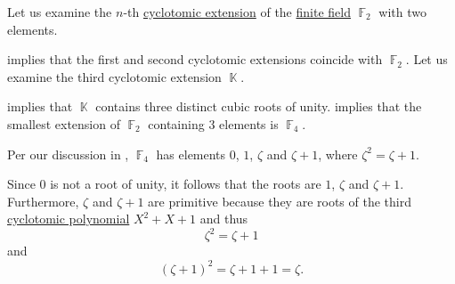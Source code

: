 \begin{example}
\begin{thmenum}
     Let us examine the \( n \)-th \hyperref[def:cyclotomic_extension]{cyclotomic extension} of the \hyperref[def:finite_field]{finite field} \( \BbbF_2 \) with two elements.

     implies that the first and second cyclotomic extensions coincide with \( \BbbF_2 \). Let us examine the third cyclotomic extension \( \BbbK \).

     implies that \( \BbbK \) contains three distinct cubic roots of unity.  implies that the smallest extension of \( \BbbF_2 \) containing \( 3 \) elements is \( \BbbF_4 \).

    Per our discussion in , \( \BbbF_4 \) has elements \( 0 \), \( 1 \), \( \zeta \) and \( \zeta + 1 \), where \( \zeta^2 = \zeta + 1 \).

    Since \( 0 \) is not a root of unity, it follows that the roots are \( 1 \), \( \zeta \) and \( \zeta + 1 \). Furthermore, \( \zeta \) and \( \zeta + 1 \) are primitive because they are roots of the third \hyperref[def:cyclotomic_polynomial]{cyclotomic polynomial} \( X^2 + X + 1 \) and thus
    \begin{equation*}
      \zeta^2 = \zeta + 1
    \end{equation*}
    and
    \begin{equation*}
      (\zeta + 1)^2 = \zeta + 1 + 1 = \zeta.
    \end{equation*}
  \end{thmenum}
\end{example}

